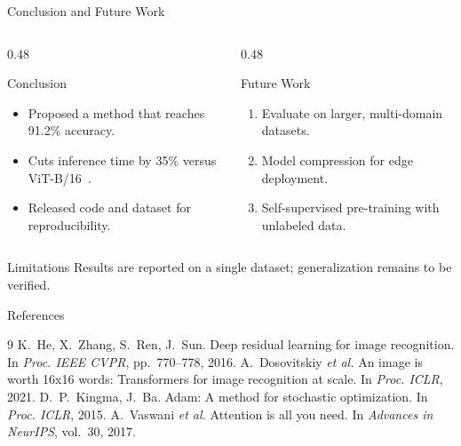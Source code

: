 \documentclass[aspectratio=169, 11pt, t]{beamer}
\begin{document}
\begin{frame}{Conclusion and Future Work}
  \begin{columns}[T]
    \begin{column}{0.48\textwidth}
      \begin{block}{Conclusion}
        \begin{itemize}
          \item Proposed a method that reaches \alert{91.2\%} accuracy.
          \item Cuts inference time by 35\% versus ViT-B/16~\cite{dosovitskiy2021vit}.
          \item Released code and dataset for reproducibility.
        \end{itemize}
      \end{block}
    \end{column}
    \begin{column}{0.48\textwidth}
      \begin{exampleblock}{Future Work}
        \begin{enumerate}
          \item Evaluate on larger, multi-domain datasets.
          \item Model compression for edge deployment.
          \item Self-supervised pre-training with unlabeled data.
        \end{enumerate}
      \end{exampleblock}
    \end{column}
  \end{columns}
  \vspace{0.3cm}
  \begin{alertblock}{Limitations}
    Results are reported on a single dataset; generalization remains to be verified.
  \end{alertblock}
\end{frame}

\begin{frame}[allowframebreaks]{References}
  \footnotesize
  \begin{thebibliography}{9}
      K.~He, X.~Zhang, S.~Ren, J.~Sun.
      \newblock Deep residual learning for image recognition.
      \newblock In \emph{Proc. IEEE CVPR}, pp.~770--778, 2016.
      A.~Dosovitskiy \emph{et al.}
      \newblock An image is worth 16x16 words: Transformers for image recognition at scale.
      \newblock In \emph{Proc. ICLR}, 2021.
      D.~P.~Kingma, J.~Ba.
      \newblock Adam: A method for stochastic optimization.
      \newblock In \emph{Proc. ICLR}, 2015.
      A.~Vaswani \emph{et al.}
      \newblock Attention is all you need.
      \newblock In \emph{Advances in NeurIPS}, vol.~30, 2017.
  \end{thebibliography}
\end{frame}

\hauithanksframe
\end{document}

